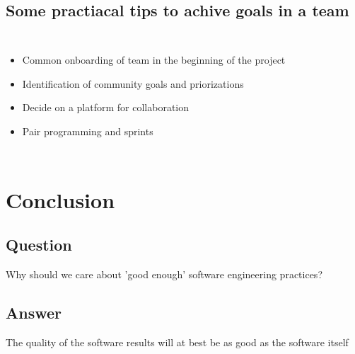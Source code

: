 \documentclass[usenames,dvipsnames]{beamer}
\theoremstyle{plain}
\theoremstyle{definition}
\begin{document}
\subsection{Some practiacal tips to achive goals in a team}

\begin{frame}{\setframetitle{}}
  \begin{columns}[t]
    
    \begin{itemize}
      \item Common onboarding of team in the beginning of the project 
      
      \item Identification of community goals and priorizations 
      
      
      \item Decide on a platform for collaboration
      
      \item Pair programming and sprints 
      
      
    \end{itemize}
  
  \end{columns}
  
\end{frame}







\section{Conclusion}
\subsection{Question}


\begin{frame}{\setframetitle{}}
  {
\centering


\Large  Why should we care about 'good enough' software engineering practices?

}
\end{frame}

\subsection{Answer}

\begin{frame}{\setframetitle{}}
  {
\centering
\Large  The quality of the software results will at best be as good as the software itself
}
\end{frame}
\end{document}
